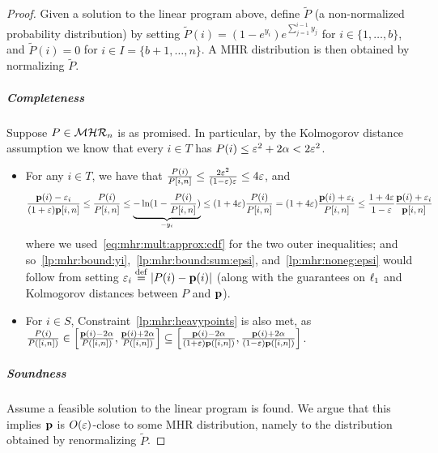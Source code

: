 \begin{proof}
Given a solution to the linear program above, define $\tilde{P}$ (a non-normalized probability distribution) by setting $\tilde{P}(i) = (1-e^{y_i})e^{\sum_{j=1}^{i-1} y_j}$ for $i\in \{1,\dots,b\}$, and $\tilde{P}(i) = 0$ for $i\in I = \{b+1,\dots, n\}$. A MHR distribution is then obtained by normalizing $\tilde{P}$. 

\subparagraph{Completeness} Suppose $P\in\classmhr$ is as promised. In particular, by the Kolmogorov distance assumption we know that every $i\in T$ has $P(i) \leq \eps^2+2\alpha < 2\eps^2$.
\begin{itemize}
  \item For any $i\in T$, we have that $\frac{P(i)}{P[i,n]} \leq \frac{2\eps^2}{(1-\eps)\eps} \leq 4\eps$, and 
\begin{equation}
  \frac{\D(i)-\eps_i}{(1+\eps)\D[i,n]} \leq \frac{P(i)}{P[i,n]} \leq \underbrace{-\ln(1-\frac{P(i)}{P[i,n]})}_{-y_i}
  \leq (1+4\eps)\frac{P(i)}{P[i,n]} = (1+4\eps)\frac{\D(i)+\eps_i}{P[i,n]} \leq \frac{1+4\eps}{1-\eps}\frac{\D(i)+\eps_i}{\D[i,n]}
\end{equation}
where we used~\cref{eq:mhr:mult:approx:cdf} for the two outer inequalities; and so~\eqref{lp:mhr:bound:yi},~\eqref{lp:mhr:bound:sum:epsi}, and~\eqref{lp:mhr:noneg:epsi} would follow from setting $\eps_i \eqdef \abs{P(i)-\D(i)}$ (along with the guarantees on $\lp[1]$ and Kolmogorov distances between $P$ and $\D$).
  \item For $i\in S$, Constraint~\eqref{lp:mhr:heavypoints} is also met, as 
  $\frac{P(i)}{P([i,n])} \in \left[\frac{\D(i)-2\alpha}{P([i,n])},\frac{\D(i)+2\alpha}{P([i,n])}\right] 
    \subseteq \left[\frac{\D(i)-2\alpha}{(1+\eps)\D([i,n])},\frac{\D(i)+2\alpha}{(1-\eps)\D([i,n])}\right]$.
\end{itemize}

\subparagraph{Soundness}
\noindent Assume a feasible solution to the linear program is found. We argue that this implies $\D$ is $\bigO{\eps}$-close to some MHR distribution, namely to the distribution obtained by renormalizing $\tilde{P}$.


\end{proof}
